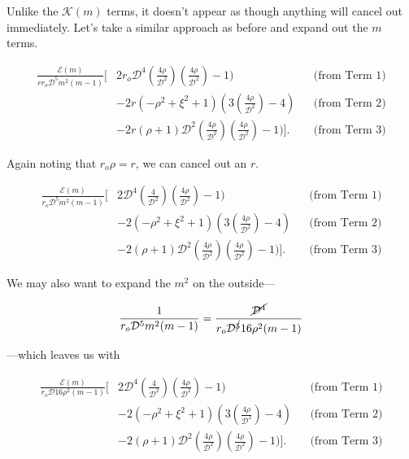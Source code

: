 \noindent Unlike the \(\mathcal{K}(m)\) terms, it doesn't appear as though anything will cancel out immediately.
%
Let's take a similar approach as before and expand out the \(m\) terms.
%

\begin{equation}
    \begin{aligned}
        \frac{\mathcal{E}(m)}{rr_o\mathcal{D}^5m^2(m-1)} \bigg[&  2r_o\mathcal{D}^4\left(\frac{4\rho}{\mathcal{D}^2}\right)\left(\frac{4\rho}{\mathcal{D}^2}\right)-1)  && \text{(from Term 1)} \\
      &- 2r(-\rho^2+\xi^2+1)\left(3\left(\frac{4\rho}{\mathcal{D}^2}\right)-4\right) && \text{(from Term 2)} \\
      &- 2r(\rho+1)\mathcal{D}^2\left(\frac{4\rho}{\mathcal{D}^2}\right)\left(\frac{4\rho}{\mathcal{D}^2}\right)-1) \bigg]. && \text{(from Term 3)}
    \end{aligned}
\end{equation}

\noindent Again noting that \(r_o\rho = r\), we can cancel out an \(r\).

\begin{equation}
    \begin{aligned}
        \frac{\mathcal{E}(m)}{r_o\mathcal{D}^5m^2(m-1)} \bigg[&  2\mathcal{D}^4\left(\frac{4}{\mathcal{D}^2}\right)\left(\frac{4\rho}{\mathcal{D}^2}\right)-1)  && \text{(from Term 1)} \\
      &- 2(-\rho^2+\xi^2+1)\left(3\left(\frac{4\rho}{\mathcal{D}^2}\right)-4\right) && \text{(from Term 2)} \\
      &- 2(\rho+1)\mathcal{D}^2\left(\frac{4\rho}{\mathcal{D}^2}\right)\left(\frac{4\rho}{\mathcal{D}^2}\right)-1) \bigg]. && \text{(from Term 3)}
    \end{aligned}
\end{equation}

\noindent We may also want to expand the \(m^2\) on the outside---

\begin{equation}
    \frac{1}{r_o\mathcal{D}^5m^2(m-1)} = \frac{\cancel{\mathcal{D}^4}}{r_o\mathcal{D}^{\cancel{5}}16\rho^2(m-1)}
\end{equation}

\noindent ---which leaves us with

\begin{equation}
    \begin{aligned}
        \frac{\mathcal{E}(m)}{r_o\mathcal{D}16\rho^2(m-1)} \bigg[&  2\mathcal{D}^4\left(\frac{4}{\mathcal{D}^2}\right)\left(\frac{4\rho}{\mathcal{D}^2}\right)-1)  && \text{(from Term 1)} \\
      &- 2(-\rho^2+\xi^2+1)\left(3\left(\frac{4\rho}{\mathcal{D}^2}\right)-4\right) && \text{(from Term 2)} \\
      &- 2(\rho+1)\mathcal{D}^2\left(\frac{4\rho}{\mathcal{D}^2}\right)\left(\frac{4\rho}{\mathcal{D}^2}\right)-1) \bigg]. && \text{(from Term 3)}
    \end{aligned}
\end{equation}

